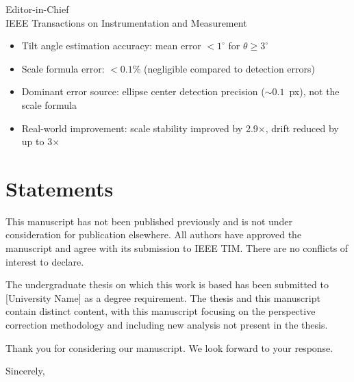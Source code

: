 \documentclass[12pt]{letter}
\begin{document}
\begin{letter}{Editor-in-Chief \\
IEEE Transactions on Instrumentation and Measurement}
\begin{itemize}
\item Tilt angle estimation accuracy: mean error $< 1^{\circ}$ for
$\theta \geq 3^{\circ}$
\item Scale formula error: $< 0.1\%$ (negligible compared to detection errors)
\item Dominant error source: ellipse center detection precision ($\sim 0.1$~px),
not the scale formula
\item Real-world improvement: scale stability improved by 2.9$\times$, drift
reduced by up to 3$\times$
\end{itemize}

\section*{Statements}

This manuscript has not been published previously and is not under consideration
for publication elsewhere. All authors have approved the manuscript and agree
with its submission to IEEE TIM. There are no conflicts of interest to declare.

The undergraduate thesis on which this work is based has been submitted to
[University Name] as a degree requirement. The thesis and this manuscript
contain distinct content, with this manuscript focusing on the perspective
correction methodology and including new analysis not present in the thesis.

Thank you for considering our manuscript. We look forward to your response.

\closing{Sincerely,}

\end{letter}
\end{document}
